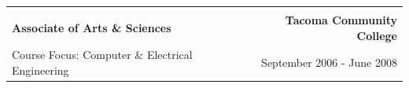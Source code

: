 \documentclass[letterpaper]{article}
\begin{document}
\begin{center}
\begin{tabular}{p{}r}
			\\
			\\
				\textbf{Associate of Arts \& Sciences}		    	&
				\textbf{Tacoma Community College \quad}
			\\
				{\quad Course Focus: Computer \& Electrical Engineering}	&
				{September 2006 - June 2008 \quad\quad}	
			\\
		\end{tabular} \\
	\end{center} 
\end{document}
